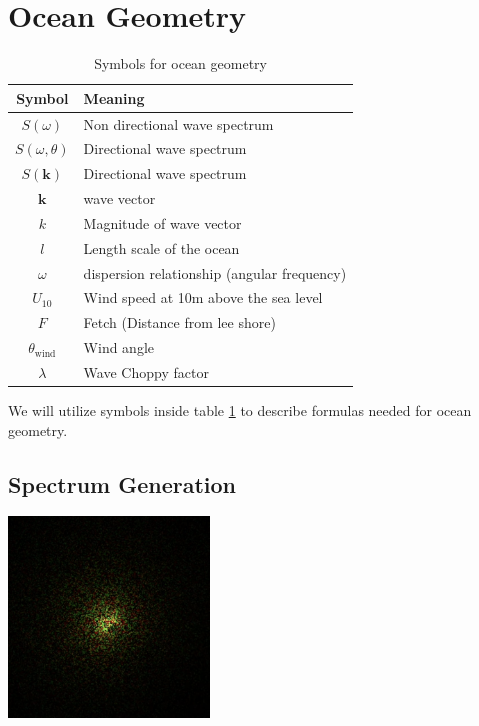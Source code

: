 \section{Ocean Geometry}
\begin{table}[H]
    \centering
    \begin{tabular}{cl}
        \toprule
        \textbf{Symbol} & \textbf{Meaning} \\
        \midrule
        $S(\omega)$ & Non directional wave spectrum \\
        $S(\omega, \theta)$ & Directional wave spectrum\\
        $S(\mathbf{k})$ & Directional wave spectrum\\
        $\mathbf{k}$ & wave vector \\
        $k$ & Magnitude of wave vector\\
        $l$ & Length scale of the ocean\\
        $\omega$ & dispersion relationship (angular frequency)\\
        $U_{10}$ & Wind speed at 10m above the sea level\\
        $F$ & Fetch (Distance from lee shore)\\
        $\theta_{\text{wind}}$ & Wind angle\\
        $\lambda$ & Wave Choppy factor\\
        \bottomrule
    \end{tabular}
    \caption{Symbols for ocean geometry}
    \label{table:deffinition_table}
\end{table}

We will utilize symbols inside table \ref{table:deffinition_table} to describe formulas needed for ocean geometry.

\subsection{Spectrum Generation}

\begin{minipage}{1\textwidth}
    \centering
    \includegraphics[width=0.40\textwidth]{"images/tma_spectrum.png"}
    \label{fig:tma_spectrum}
\end{minipage}
\vspace{0cm}

